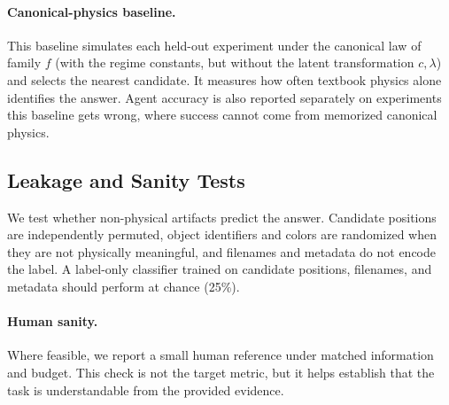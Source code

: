 \paragraph{Canonical-physics baseline.} This baseline simulates each held-out experiment under the canonical law of family $f$ (with the regime constants, but without the latent transformation $c,\lambda$) and selects the nearest candidate. It measures how often textbook physics alone identifies the answer. Agent accuracy is also reported separately on experiments this baseline gets wrong, where success cannot come from memorized canonical physics. 

\subsection{Leakage and Sanity Tests}

We test whether non-physical artifacts predict the answer. Candidate positions are independently permuted, object identifiers and colors are randomized when they are not physically meaningful, and filenames and metadata do not encode the label. A label-only classifier trained on candidate positions, filenames, and metadata should perform at chance (25\%). 

\paragraph{Human sanity.} Where feasible, we report a small human reference under matched information and budget. This check is not the target metric, but it helps establish that the task is understandable from the provided evidence. 
